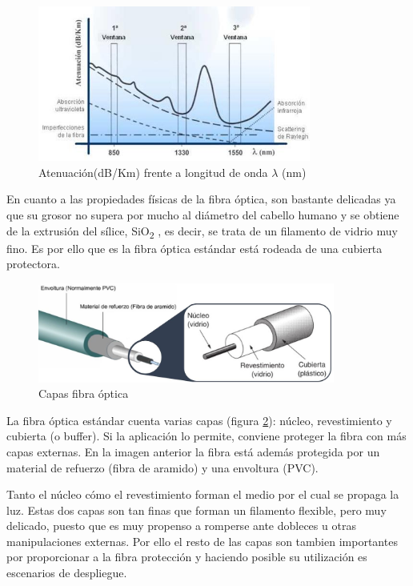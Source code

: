 \begin{itemize}
 	\begin{figure}[H]
 		\centering
 		\includegraphics[width=0.8\textwidth]{./img/perdidasFrec}
 		\caption{Atenuación(dB/Km) frente a longitud de onda  $\lambda$ (nm) \cite{imgRadioModo}}
 		\label{fig:perdidasFrec}
 	\end{figure}

 En cuanto a las propiedades físicas de la fibra óptica, son bastante delicadas ya que su grosor no supera por mucho al diámetro del cabello humano y se obtiene de la extrusión del sílice, SiO\textsubscript{2} , es decir, se trata de un filamento de vidrio muy fino. Es por ello que es la fibra óptica estándar está rodeada de una cubierta protectora. 
 
  \begin{figure}[H]
  	\centering
  	\includegraphics[width=0.87\textwidth]{./img/capas-fibra2}
  	\caption{Capas fibra óptica \cite{imgNucleoFibra,imgCapasFO}} 
  	\label{fig:capasFibra}
  \end{figure} 
  
  
  
 La fibra óptica estándar cuenta varias capas (figura \ref{fig:capasFibra}): núcleo, revestimiento y cubierta (o buffer).  Si la aplicación lo permite, conviene proteger la fibra con más capas externas. En la imagen anterior la fibra está además protegida por un material de refuerzo (fibra de aramido) y una envoltura (PVC).
 
 Tanto el núcleo cómo el revestimiento forman el medio por el cual se propaga la luz. Estas dos capas son tan finas que forman un filamento flexible, pero muy delicado, puesto que es muy propenso a romperse ante dobleces u otras manipulaciones externas. Por ello el resto de las capas son tambien importantes por proporcionar a la fibra protección y haciendo posible su utilización es escenarios de despliegue.
 

\end{itemize}
